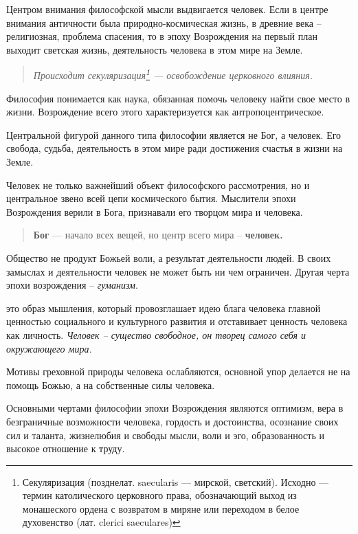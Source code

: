 \documentclass[
]{article}
\providecommand{\tightlist}{%
  \setlength{\itemsep}{0pt}\setlength{\parskip}{0pt}}
\begin{document}
Центром внимания философской мысли выдвигается человек. Если в центре
внимания античности была природно-космическая жизнь, в древние века --
религиозная, проблема спасения, то в эпоху Возрождения на первый план
выходит светская жизнь, деятельность человека в этом мире на Земле.

\begin{quote}
\emph{Происходит секуляризация\footnote{Секуляризация (позднелат.
  saecularis --- мирской, светский). Исходно --- термин католического
  церковного права, обозначающий выход из монашеского ордена с возвратом
  в миряне или переходом в белое духовенство (лат. clerici saeculares)}
--- освобождение церковного влияния.}
\end{quote}

Философия понимается как наука, обязанная помочь человеку найти свое
место в жизни. Возрождение всего этого характеризуется как
антропоцентрическое.

Центральной фигурой данного типа философии является не Бог, а человек.
Его свобода, судьба, деятельность в этом мире ради достижения счастья в
жизни на Земле.

Человек не только важнейший объект философского рассмотрения, но и
центральное звено всей цепи космического бытия. Мыслители эпохи
Возрождения верили в Бога, признавали его творцом мира и человека.

\begin{quote}
\textbf{Бог} --- начало всех вещей, но центр всего мира --
\textbf{человек.}
\end{quote}

Общество не продукт Божьей воли, а результат деятельности людей. В своих
замыслах и деятельности человек не может быть ни чем ограничен. Другая
черта эпохи возрождения -- \emph{гуманизм}.

\begin{description}
\tightlist
\item[\textbf{Гуманизм --}]
это образ мышления, который провозглашает идею блага человека главной
ценностью социального и культурного развития и отставивает ценность
человека как личность. \emph{Человек -- существо свободное, он творец
самого себя и окружающего мира.}
\end{description}

Мотивы греховной природы человека ослабляются, основной упор делается не
на помощь Божью, а на собственные силы человека.

Основными чертами философии эпохи Возрождения являются оптимизм, вера в
безграничные возможности человека, гордость и достоинства, осознание
своих сил и таланта, жизнелюбия и свободы мысли, воли и эго,
образованность и высокое отношение к труду.
\end{document}

